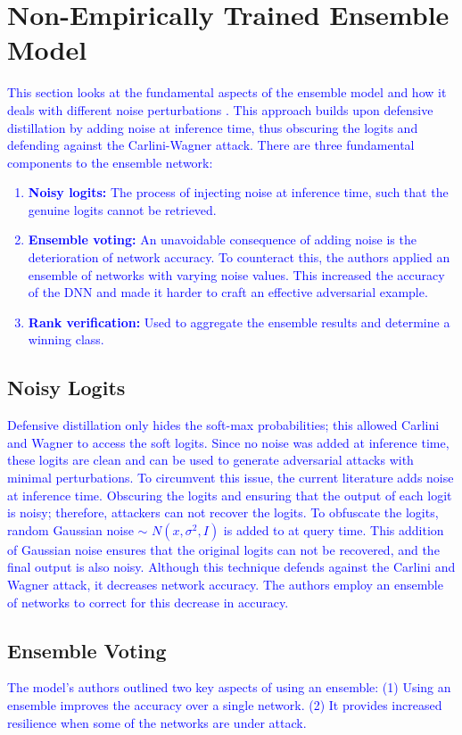 \documentclass{article}
\begin{document}
\section{Non-Empirically Trained Ensemble Model}
\textcolor{blue}{
This section looks at the fundamental aspects of the ensemble model and how it deals with different noise perturbations \cite{reference1}. This approach builds upon defensive distillation \cite{reference7} by adding noise at inference time, thus obscuring the logits and defending against the Carlini-Wagner attack. There are three fundamental components to the ensemble network:
}
\textcolor{blue}{
\begin{enumerate}
    \item \textbf{Noisy logits:} The process of injecting noise at inference time, such that the genuine logits cannot be retrieved.
    \item \textbf{Ensemble voting:} An unavoidable consequence of adding noise is the deterioration of network accuracy. To counteract this, the authors applied an ensemble of networks with varying noise values. This increased the accuracy of the DNN and made it harder to craft an effective adversarial example.
    \item \textbf{Rank verification:} Used to aggregate the ensemble results and determine a winning class.
\end{enumerate}
}

\subsection{Noisy Logits}
\textcolor{blue}{
Defensive distillation only hides the soft-max probabilities; this allowed Carlini and Wagner to access the soft logits. Since no noise was added at inference time, these logits are clean and can be used to generate adversarial attacks with minimal perturbations. To circumvent this issue, the current literature \cite{reference1} adds noise at inference time. Obscuring the logits and ensuring that the output of each logit is noisy; therefore, attackers can not recover the logits.
To obfuscate the logits, random Gaussian noise \epsilon $ \sim $ \(N(x, \sigma^2, I)\) is added to at query time. This addition of Gaussian noise ensures that the original logits can not be recovered, and the final output is also noisy. Although this technique defends against the Carlini and Wagner attack, it decreases network accuracy. The authors employ an ensemble of networks to correct for this decrease in accuracy.
}
\subsection{Ensemble Voting}
\textcolor{blue}{
The model's authors outlined two key aspects of using an ensemble: (1) Using an ensemble improves the accuracy over a single network. (2) It provides increased resilience when some of the networks are under attack.}
\end{document}
